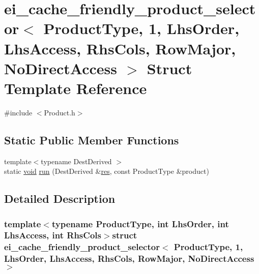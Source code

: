 \hypertarget{structei__cache__friendly__product__selector_3_01_product_type_00_011_00_01_lhs_order_00_01_lhs_cb3c1f362325f3048427473bccd6d7a7}{\section{ei\-\_\-cache\-\_\-friendly\-\_\-product\-\_\-selector$<$ Product\-Type, 1, Lhs\-Order, Lhs\-Access, Rhs\-Cols, Row\-Major, No\-Direct\-Access $>$ Struct Template Reference}
\label{structei__cache__friendly__product__selector_3_01_product_type_00_011_00_01_lhs_order_00_01_lhs_cb3c1f362325f3048427473bccd6d7a7}
}


{\ttfamily \#include $<$Product.\-h$>$}

\subsection*{Static Public Member Functions}
\begin{DoxyCompactItemize}
\item 
{\footnotesize template$<$typename Dest\-Derived $>$ }\\static \hyperlink{group___u_a_v_objects_plugin_ga444cf2ff3f0ecbe028adce838d373f5c}{void} \hyperlink{structei__cache__friendly__product__selector_3_01_product_type_00_011_00_01_lhs_order_00_01_lhs_cb3c1f362325f3048427473bccd6d7a7_a8316c3197c4d4e62349a4baf6f5d3d29}{run} (Dest\-Derived \&\hyperlink{glext_8h_a1dbb21208b9047cc8031ca9c840d3c2f}{res}, const Product\-Type \&product)
\end{DoxyCompactItemize}


\subsection{Detailed Description}
\subsubsection*{template$<$typename Product\-Type, int Lhs\-Order, int Lhs\-Access, int Rhs\-Cols$>$struct ei\-\_\-cache\-\_\-friendly\-\_\-product\-\_\-selector$<$ Product\-Type, 1, Lhs\-Order, Lhs\-Access, Rhs\-Cols, Row\-Major, No\-Direct\-Access $>$}



